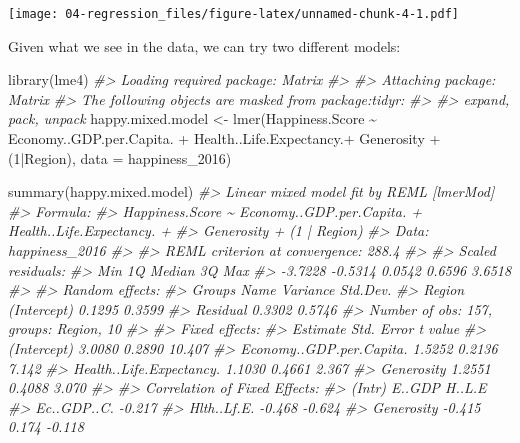 \documentclass[
]{book}
\newenvironment{Shaded}{\begin{snugshade}}{\end{snugshade}}
\newcommand{\AttributeTok}[1]{\textcolor[rgb]{0.77,0.63,0.00}{#1}}
\newcommand{\CommentTok}[1]{\textcolor[rgb]{0.56,0.35,0.01}{\textit{#1}}}
\newcommand{\DecValTok}[1]{\textcolor[rgb]{0.00,0.00,0.81}{#1}}
\newcommand{\FunctionTok}[1]{\textcolor[rgb]{0.00,0.00,0.00}{#1}}
\newcommand{\NormalTok}[1]{#1}
\newcommand{\OtherTok}[1]{\textcolor[rgb]{0.56,0.35,0.01}{#1}}
\newcommand{\SpecialCharTok}[1]{\textcolor[rgb]{0.00,0.00,0.00}{#1}}
\theoremstyle{definition}
\theoremstyle{definition}
\theoremstyle{definition}
\theoremstyle{definition}
\theoremstyle{remark}
\begin{document}
\texttt{[image: 04-regression\_files/figure-latex/unnamed-chunk-4-1.pdf]}

Given what we see in the data, we can try two different models:

\begin{Shaded}
\begin{Highlighting}[]
\FunctionTok{library}\NormalTok{(lme4)}
\CommentTok{\#\textgreater{} Loading required package: Matrix}
\CommentTok{\#\textgreater{} }
\CommentTok{\#\textgreater{} Attaching package: \textquotesingle{}Matrix\textquotesingle{}}
\CommentTok{\#\textgreater{} The following objects are masked from \textquotesingle{}package:tidyr\textquotesingle{}:}
\CommentTok{\#\textgreater{} }
\CommentTok{\#\textgreater{}     expand, pack, unpack}
\NormalTok{happy.mixed.model }\OtherTok{\textless{}{-}}  \FunctionTok{lmer}\NormalTok{(Happiness.Score }\SpecialCharTok{\textasciitilde{}}\NormalTok{ Economy..GDP.per.Capita. }\SpecialCharTok{+}\NormalTok{ Health..Life.Expectancy.}\SpecialCharTok{+}\NormalTok{ Generosity }\SpecialCharTok{+}\NormalTok{ (}\DecValTok{1}\SpecialCharTok{|}\NormalTok{Region), }\AttributeTok{data =}\NormalTok{ happiness\_2016)}

\FunctionTok{summary}\NormalTok{(happy.mixed.model)}
\CommentTok{\#\textgreater{} Linear mixed model fit by REML [\textquotesingle{}lmerMod\textquotesingle{}]}
\CommentTok{\#\textgreater{} Formula: }
\CommentTok{\#\textgreater{} Happiness.Score \textasciitilde{} Economy..GDP.per.Capita. + Health..Life.Expectancy. +  }
\CommentTok{\#\textgreater{}     Generosity + (1 | Region)}
\CommentTok{\#\textgreater{}    Data: happiness\_2016}
\CommentTok{\#\textgreater{} }
\CommentTok{\#\textgreater{} REML criterion at convergence: 288.4}
\CommentTok{\#\textgreater{} }
\CommentTok{\#\textgreater{} Scaled residuals: }
\CommentTok{\#\textgreater{}     Min      1Q  Median      3Q     Max }
\CommentTok{\#\textgreater{} {-}3.7228 {-}0.5314  0.0542  0.6596  3.6518 }
\CommentTok{\#\textgreater{} }
\CommentTok{\#\textgreater{} Random effects:}
\CommentTok{\#\textgreater{}  Groups   Name        Variance Std.Dev.}
\CommentTok{\#\textgreater{}  Region   (Intercept) 0.1295   0.3599  }
\CommentTok{\#\textgreater{}  Residual             0.3302   0.5746  }
\CommentTok{\#\textgreater{} Number of obs: 157, groups:  Region, 10}
\CommentTok{\#\textgreater{} }
\CommentTok{\#\textgreater{} Fixed effects:}
\CommentTok{\#\textgreater{}                          Estimate Std. Error t value}
\CommentTok{\#\textgreater{} (Intercept)                3.0080     0.2890  10.407}
\CommentTok{\#\textgreater{} Economy..GDP.per.Capita.   1.5252     0.2136   7.142}
\CommentTok{\#\textgreater{} Health..Life.Expectancy.   1.1030     0.4661   2.367}
\CommentTok{\#\textgreater{} Generosity                 1.2551     0.4088   3.070}
\CommentTok{\#\textgreater{} }
\CommentTok{\#\textgreater{} Correlation of Fixed Effects:}
\CommentTok{\#\textgreater{}             (Intr) E..GDP H..L.E}
\CommentTok{\#\textgreater{} Ec..GDP..C. {-}0.217              }
\CommentTok{\#\textgreater{} Hlth..Lf.E. {-}0.468 {-}0.624       }
\CommentTok{\#\textgreater{} Generosity  {-}0.415  0.174 {-}0.118}


\end{Highlighting}
\end{Shaded}
\end{document}
